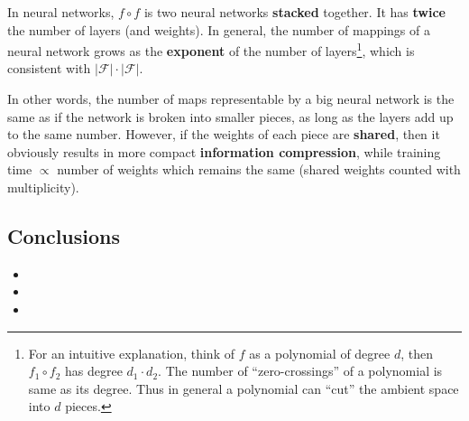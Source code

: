 \begin{preview}
\begin{minipage}{\textwidth}
In neural networks, $f \circ f$ is two neural networks \textbf{stacked} together.  It has \textbf{twice} the number of layers (and weights).  In general, the number of mappings of a neural network grows as the \textbf{exponent} of the number of layers\footnote{For an intuitive explanation, think of $f$ as a polynomial of degree $d$, then $f_1 \circ f_2$ has degree $d_1 \cdot d_2$.  The number of ``zero-crossings'' of a polynomial is same as its degree.  Thus in general a polynomial can ``cut'' the ambient space into $d$ pieces.}, which is consistent with $|\mathcal{F}|\cdot|\mathcal{F}|$.

In other words, the number of maps representable by a big neural network is the same as if the network is broken into smaller pieces, as long as the layers add up to the same number.  However, if the weights of each piece are \textbf{shared}, then it obviously results in more compact \textbf{information compression}, while training time $\propto$ number of weights which remains the same (shared weights counted with multiplicity).

\subsection{Conclusions}

\begin{itemize}
	\item {}

	\item {}

	\item {}

\end{itemize}

\end{minipage}
\end{preview}

